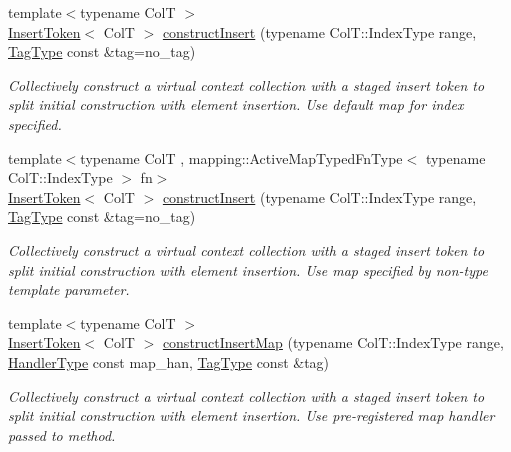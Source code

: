 \begin{DoxyCompactItemize}
{\footnotesize template$<$typename ColT $>$ }\\\hyperlink{structvt_1_1vrt_1_1collection_1_1_insert_token}{Insert\+Token}$<$ ColT $>$ \hyperlink{structvt_1_1vrt_1_1collection_1_1_collection_manager_a0e15cc861c0d979d8977b226efd7c271}{construct\+Insert} (typename Col\+T\+::\+Index\+Type range, \hyperlink{namespacevt_a84ab281dae04a52a4b243d6bf62d0e52}{Tag\+Type} const \&tag=no\+\_\+tag)
\begin{DoxyCompactList}\small\item\em Collectively construct a virtual context collection with a staged insert token to split initial construction with element insertion. Use default map for index specified. \end{DoxyCompactList}\item 
{\footnotesize template$<$typename ColT , mapping\+::\+Active\+Map\+Typed\+Fn\+Type$<$ typename Col\+T\+::\+Index\+Type $>$ fn$>$ }\\\hyperlink{structvt_1_1vrt_1_1collection_1_1_insert_token}{Insert\+Token}$<$ ColT $>$ \hyperlink{structvt_1_1vrt_1_1collection_1_1_collection_manager_a51e938c8c05bf9a39ab69532ea12336d}{construct\+Insert} (typename Col\+T\+::\+Index\+Type range, \hyperlink{namespacevt_a84ab281dae04a52a4b243d6bf62d0e52}{Tag\+Type} const \&tag=no\+\_\+tag)
\begin{DoxyCompactList}\small\item\em Collectively construct a virtual context collection with a staged insert token to split initial construction with element insertion. Use map specified by non-\/type template parameter. \end{DoxyCompactList}\item 
{\footnotesize template$<$typename ColT $>$ }\\\hyperlink{structvt_1_1vrt_1_1collection_1_1_insert_token}{Insert\+Token}$<$ ColT $>$ \hyperlink{structvt_1_1vrt_1_1collection_1_1_collection_manager_a241cdb64c59578ba82d2641ffb78209a}{construct\+Insert\+Map} (typename Col\+T\+::\+Index\+Type range, \hyperlink{namespacevt_af64846b57dfcaf104da3ef6967917573}{Handler\+Type} const map\+\_\+han, \hyperlink{namespacevt_a84ab281dae04a52a4b243d6bf62d0e52}{Tag\+Type} const \&tag)
\begin{DoxyCompactList}\small\item\em Collectively construct a virtual context collection with a staged insert token to split initial construction with element insertion. Use pre-\/registered map handler passed to method. \end{DoxyCompactList}\item 

\end{DoxyCompactItemize}
